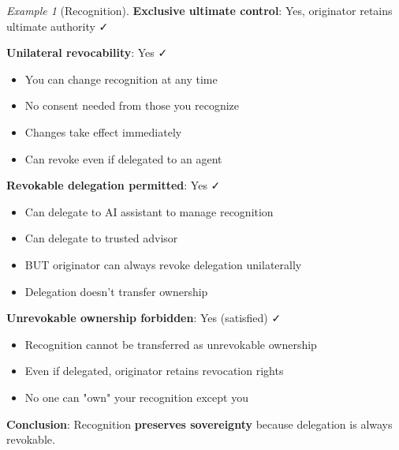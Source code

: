\documentclass[11pt,a4paper]{article}
\theoremstyle{definition}
\theoremstyle{remark}
\newtheorem{example}[theorem]{Example}
\begin{document}
\begin{example}[Recognition]
\textbf{Exclusive ultimate control}: Yes, originator retains ultimate authority ✓

\textbf{Unilateral revocability}: Yes ✓
\begin{itemize}
\item You can change recognition at any time
\item No consent needed from those you recognize
\item Changes take effect immediately
\item Can revoke even if delegated to an agent
\end{itemize}

\textbf{Revokable delegation permitted}: Yes ✓
\begin{itemize}
\item Can delegate to AI assistant to manage recognition
\item Can delegate to trusted advisor
\item BUT originator can always revoke delegation unilaterally
\item Delegation doesn't transfer ownership
\end{itemize}

\textbf{Unrevokable ownership forbidden}: Yes (satisfied) ✓
\begin{itemize}
\item Recognition cannot be transferred as unrevokable ownership
\item Even if delegated, originator retains revocation rights
\item No one can "own" your recognition except you
\end{itemize}

\textbf{Conclusion}: Recognition \textbf{preserves sovereignty} because delegation is always revokable.
\end{example}
\end{document}
